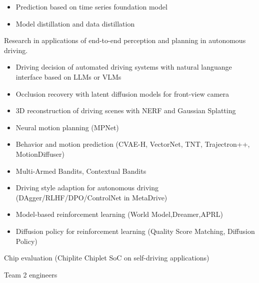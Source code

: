 \documentclass[../cv.tex]{subfiles}
\begin{document}
\begin{cventries}
{\begin{cvitems}
\begin{itemize}
				      $\rightarrow$ \textbf{funes-ts} \href{https://github.com/binjian/funes-ts/}{\faGithub}
				\item Prediction based on time series foundation model
				\item Model distillation and data distillation
			\end{itemize}
			\item Research in applications of end-to-end perception and planning in autonomous driving.
			\begin{itemize}
				\item Driving decision of automated driving systems with natural languange interface based on LLMs or VLMs \supercite{Xin_LLM_24}  \supercite{Xin_VLM_24}
				\item Occlusion recovery with latent diffusion models for front-view camera \supercite{Xin_Latent_Diffusion_23}
				\item 3D reconstruction of driving scenes with NERF and Gaussian Splatting
				\item Neural motion planning (MPNet)
				\item Behavior and motion prediction (CVAE-H, VectorNet, TNT, Trajectron++, MotionDiffuser)
				\item Multi-Armed Bandits, Contextual Bandits
				\item Driving style adaption for autonomous driving (DAgger/RLHF/DPO/ControlNet in MetaDrive)
				\item Model-based reinforcement learning (World Model,Dreamer,APRL)
				\item Diffusion policy for reinforcement learning (Quality Score Matching, Diffusion Policy)
			\end{itemize}
			\item Chip evaluation (Chiplite Chiplet SoC on self-driving applications)
			\item Team 2 engineers
		\end{cvitems}
	}


\end{cventries}
\end{document}
